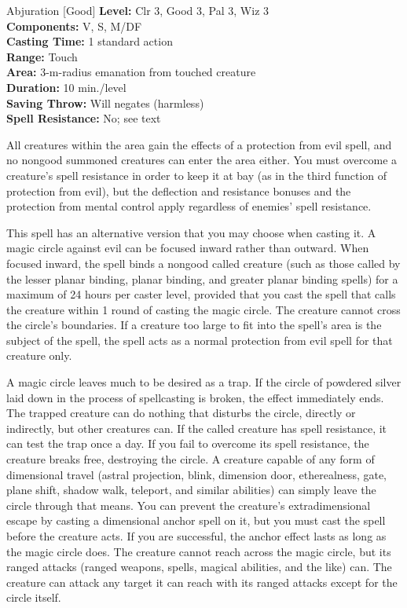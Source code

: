 {Abjuration [Good]}
{
	\textbf{Level:}
	Clr 3, Good 3, Pal 3, Wiz 3\\
	\textbf{Components:}
	V, S, M/DF\\
	\textbf{Casting Time:}
	1 standard action\\
	\textbf{Range:}
	Touch\\
	\textbf{Area:}
	3-m-radius emanation from touched creature\\
	\textbf{Duration:}
	10 min./level\\
	\textbf{Saving Throw:}
	Will negates (harmless)\\
	\textbf{Spell Resistance:}
	No; see text\\
}
{
	All creatures within the area gain the effects of a protection from evil spell, and no nongood summoned creatures can enter the area either. You must overcome a creature's spell resistance in order to keep it at bay (as in the third function of protection from evil), but the deflection and resistance bonuses and the protection from mental control apply regardless of enemies' spell resistance.

	This spell has an alternative version that you may choose when casting it. A magic circle against evil can be focused inward rather than outward. When focused inward, the spell binds a nongood called creature (such as those called by the lesser planar binding, planar binding, and greater planar binding spells) for a maximum of 24 hours per caster level, provided that you cast the spell that calls the creature within 1 round of casting the magic circle. The creature cannot cross the circle's boundaries. If a creature too large to fit into the spell's area is the subject of the spell, the spell acts as a normal protection from evil spell for that creature only.

	A magic circle leaves much to be desired as a trap. If the circle of powdered silver laid down in the process of spellcasting is broken, the effect immediately ends. The trapped creature can do nothing that disturbs the circle, directly or indirectly, but other creatures can. If the called creature has spell resistance, it can test the trap once a day. If you fail to overcome its spell resistance, the creature breaks free, destroying the circle. A creature capable of any form of dimensional travel (astral projection, blink, dimension door, etherealness, gate, plane shift, shadow walk, teleport, and similar abilities) can simply leave the circle through that means. You can prevent the creature's extradimensional escape by casting a dimensional anchor spell on it, but you must cast the spell before the creature acts. If you are successful, the anchor effect lasts as long as the magic circle does. The creature cannot reach across the magic circle, but its ranged attacks (ranged weapons, spells, magical abilities, and the like) can. The creature can attack any target it can reach with its ranged attacks except for the circle itself.

}
